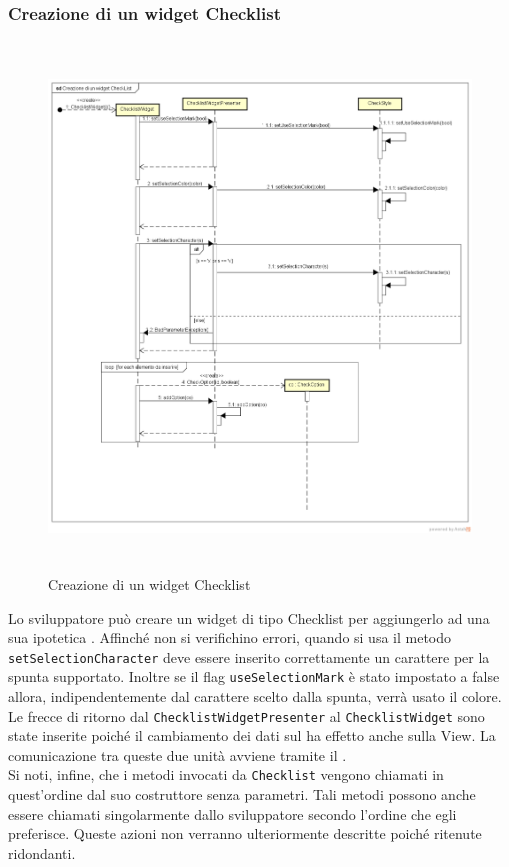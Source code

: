 \newpage

\subsubsection{Creazione di un widget Checklist}

\label{Creazione di un widget Checklist}
\begin{figure}[H]
	\centering
	\includegraphics[width=16cm, height=14cm]{Sezioni/Diagrammi/img/Creazione di un widget CheckList.png}
	\caption{Creazione di un widget Checklist}
\end{figure}

Lo sviluppatore può creare un widget di tipo Checklist per aggiungerlo ad una sua ipotetica . Affinché non si verifichino errori, quando si usa il metodo \texttt{setSelectionCharacter} deve essere inserito correttamente un carattere per la spunta supportato. Inoltre se il flag \texttt{useSelectionMark} è stato impostato a false allora, indipendentemente dal carattere scelto dalla spunta, verrà usato il colore.\\
Le frecce di ritorno dal \texttt{ChecklistWidgetPresenter}  al \texttt{ChecklistWidget} sono state inserite poiché il cambiamento dei dati sul  ha effetto anche sulla View. La comunicazione tra queste due unità avviene tramite il  . \\
Si noti, infine, che i metodi invocati da \texttt{Checklist} vengono chiamati in quest'ordine dal suo costruttore senza parametri. Tali metodi possono anche essere chiamati singolarmente dallo sviluppatore secondo l'ordine che egli preferisce. Queste azioni non verranno ulteriormente descritte poiché ritenute ridondanti.

